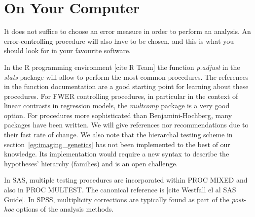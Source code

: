 \documentclass[draft,12pt]{article}
\begin{document}
\appendix

\section{\label{sec:on_your_pc} On Your Computer}
It does not suffice to choose an error measure in order to perform an analysis. An error-controlling procedure will also have to be chosen, and this is what you should look for in your favourite software. 

In the R programming environment [cite R Team] the function \emph{p.adjust} in the \emph{stats} package will allow to perform the most common procedures. The references in the function documentation are a good starting point for learning about these procedures. For FWER controlling procedures, in particular in the context of linear contrasts in regression models, the \emph{multcomp} package is a very good option. For procedures more sophisticated than Benjamini-Hochberg, many packages have been written. We will give references nor recommendations due to their fast rate of change. 
We also note that the hierarchal testing scheme in section~\ref{eg:imaging_genetics} has not been implemented to the best of our knowledge. Its implementation would require a new syntax to describe the hypotheses' hierarchy (families) and is an open challenge. 

In SAS, multiple testing procedures are incorporated within PROC MIXED and also in PROC MULTEST.  The canonical reference is [cite Westfall el al SAS Guide]. In SPSS, multiplicity corrections are typically found as part of the \emph{post-hoc} options of the analysis methods.
\end{document}
